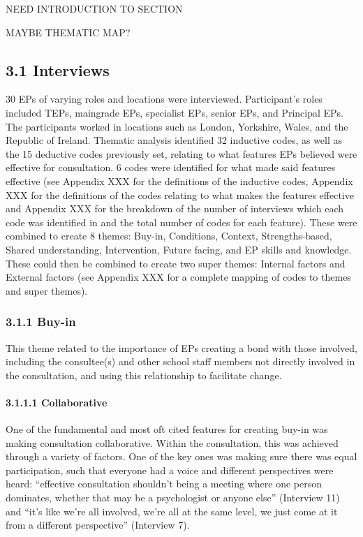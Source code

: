 \documentclass[
]{article}
\begin{document}
NEED INTRODUCTION TO SECTION

MAYBE THEMATIC MAP?

\hypertarget{interviews-2}{%
\subsection{3.1 Interviews}\label{interviews-2}}

30 EPs of varying roles and locations were interviewed. Participant's
roles included TEPs, maingrade EPs, specialist EPs, senior EPs, and
Principal EPs. The participants worked in locations such as London,
Yorkshire, Wales, and the Republic of Ireland. Thematic analysis
identified 32 inductive codes, as well as the 15 deductive codes
previously set, relating to what features EPs believed were effective
for consultation. 6 codes were identified for what made said features
effective (see Appendix XXX for the definitions of the inductive codes,
Appendix XXX for the definitions of the codes relating to what makes the
features effective and Appendix XXX for the breakdown of the number of
interviews which each code was identified in and the total number of
codes for each feature). These were combined to create 8 themes: Buy-in,
Conditions, Context, Strengths-based, Shared understanding,
Intervention, Future facing, and EP skills and knowledge. These could
then be combined to create two super themes: Internal factors and
External factors (see Appendix XXX for a complete mapping of codes to
themes and super themes).

\hypertarget{buy-in}{%
\subsubsection{3.1.1 Buy-in}\label{buy-in}}

This theme related to the importance of EPs creating a bond with those
involved, including the consultee(s) and other school staff members not
directly involved in the consultation, and using this relationship to
facilitate change.

\hypertarget{collaborative}{%
\paragraph{3.1.1.1 Collaborative}\label{collaborative}}

One of the fundamental and most oft cited features for creating buy-in
was making consultation collaborative. Within the consultation, this was
achieved through a variety of factors. One of the key ones was making
sure there was equal participation, such that everyone had a voice and
different perspectives were heard: ``effective consultation shouldn't
being a meeting where one person dominates, whether that may be a
psychologist or anyone else'' (Interview 11) and ``it's like we're all
involved, we're all at the same level, we just come at it from a
different perspective'' (Interview 7).
\end{document}

